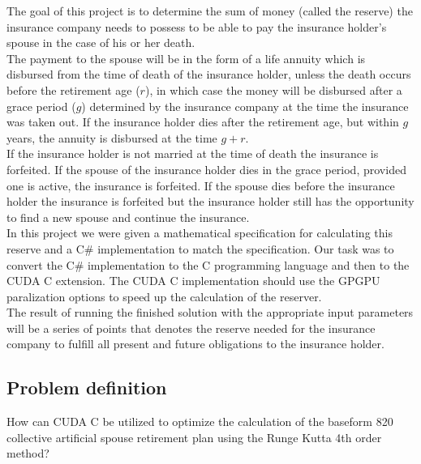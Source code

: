 
The goal of this project is to determine the sum of money (called the reserve) the insurance company needs to possess to be able to pay the insurance holder's spouse in the case of his or her death. \\

The payment to the spouse will be in the form of a life annuity which is disbursed from the time of death of the insurance holder, unless the death occurs before the retirement age ($r$), in which case the money will be disbursed after a grace period ($g$) determined by the insurance company at the time the insurance was taken out. If the insurance holder dies after the retirement age, but within $g$ years, the annuity is disbursed at the time $g + r$. \\

If the insurance holder is not married at the time of death the insurance is forfeited. If the spouse of the insurance holder dies in the grace period, provided one is active, the insurance is forfeited. If the spouse dies before the insurance holder the insurance is forfeited but the insurance holder still has the opportunity to find a new spouse and continue the insurance. \\

In this project we were given a mathematical specification for calculating this reserve \cite{edlu} and a C\# implementation to match the specification. Our task was to convert the C\# implementation to the C programming language and then to the CUDA C extension. The CUDA C implementation should use the GPGPU paralization options to speed up the calculation of the reserver. \\

The result of running the finished solution with the appropriate input parameters will be a series of points that denotes the reserve needed for the insurance company to fulfill all present and future obligations to the insurance holder.

\subsection{Problem definition}
How can CUDA C be utilized to optimize the calculation of the baseform 820 collective artificial spouse retirement plan using the Runge Kutta 4th order method?

